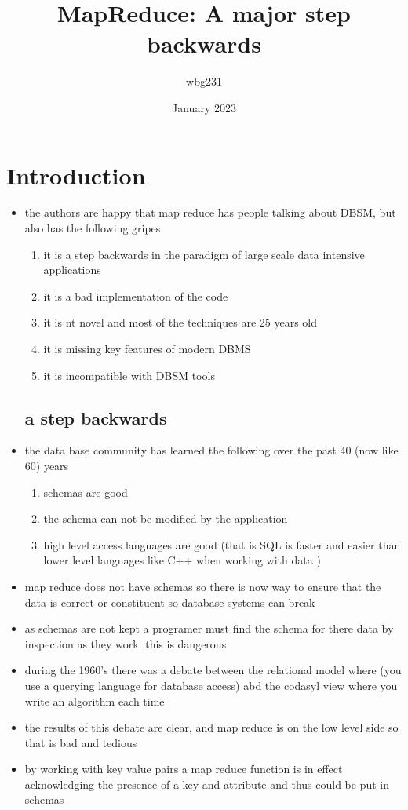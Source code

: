 \documentclass{article}
\title{MapReduce: A major step backwards}
\author{wbg231 }
\date{January 2023}
\begin{document}
\maketitle

\section{Introduction}
\begin{itemize}
    \item the authors are happy that map reduce has people talking about DBSM, but also has the following gripes
    \begin{enumerate}
        \item it is a step backwards in the paradigm of large scale data intensive applications
        \item it is a bad implementation of the code 
        \item it is nt novel and most of the techniques are 25 years old
        \item it is missing key features of modern DBMS 
        \item it is incompatible with DBSM tools
    \end{enumerate}
    \subsection*{a step backwards}
    \item the data base community has learned the following over the past 40 (now like 60) years 
    \begin{enumerate}
        \item schemas are good
        \item the schema can not be modified by the application
        \item high level access languages are good (that is SQL is faster and easier than lower level languages like C++ when working with data )
    \end{enumerate}
    \item map reduce does not have schemas so there is now way to ensure that the data is correct or constituent so database systems can break 
    \item as schemas are not kept a programer must find the schema for there data by inspection as they work. this is dangerous
    \item during the 1960's there was a debate between the relational model where (you use a querying language for database access) abd the codasyl view where you write an algorithm each time 
    \item the results of this debate are clear, and map reduce is on the low level side so that is bad and tedious 
    \item by working with key value pairs a map reduce function is in effect acknowledging the presence of a key and attribute and thus could be put in  schemas

\end{itemize}
\end{document}
